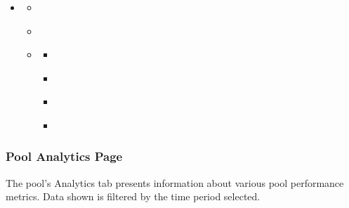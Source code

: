 \documentclass[letterpaper,10pt,english]{sphinxmanual}
\begin{document}
\begin{sphinxShadowBox}
\begin{itemize}
\item {} 
\label{\detokenize{getting_started/pool:id10}}{\hyperref[\detokenize{getting_started/pool:pools}]{}}
\begin{itemize}
\item {} 
\label{\detokenize{getting_started/pool:id11}}{\hyperref[\detokenize{getting_started/pool:what-is-a-pool}]{}}

\item {} 
\label{\detokenize{getting_started/pool:id12}}{\hyperref[\detokenize{getting_started/pool:pools-page}]{}}

\item {} 
\label{\detokenize{getting_started/pool:id13}}{\hyperref[\detokenize{getting_started/pool:pool-details-page}]{}}
\begin{itemize}
\item {} 
\label{\detokenize{getting_started/pool:id14}}{\hyperref[\detokenize{getting_started/pool:pool-analytics-page}]{}}

\item {} 
\label{\detokenize{getting_started/pool:id15}}{\hyperref[\detokenize{getting_started/pool:pool-end-to-end-timing}]{}}

\item {} 
\label{\detokenize{getting_started/pool:id16}}{\hyperref[\detokenize{getting_started/pool:pool-metrics}]{}}

\item {} 
\label{\detokenize{getting_started/pool:id17}}{\hyperref[\detokenize{getting_started/pool:pool-chart-pane}]{}}

\end{itemize}

\end{itemize}

\end{itemize}
\end{sphinxShadowBox}


\subsubsection{Pool Analytics Page}
\label{\detokenize{getting_started/pool:pool-analytics-page}}
The pool's Analytics tab presents information about various pool performance metrics. Data shown is filtered by the time period selected.
\end{document}
